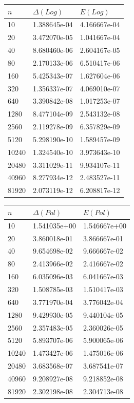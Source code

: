 \begin{figure}[H]
 \begin{subtable}[b]{0.5\textwidth}
  \centering\small
\begin{tabular}{lll}
\hline
$n$ & $\Delta(Log)$ & $E(Log)$\\
\hline
10 & 1.388645e-04 & 4.166667e-04\\
20 & 3.472070e-05 & 1.041667e-04\\
40 & 8.680460e-06 & 2.604167e-05\\
80 & 2.170133e-06 & 6.510417e-06\\
160 & 5.425343e-07 & 1.627604e-06\\
320 & 1.356337e-07 & 4.069010e-07\\
640 & 3.390842e-08 & 1.017253e-07\\
1280 & 8.477104e-09 & 2.543132e-08\\
2560 & 2.119278e-09 & 6.357829e-09\\
5120 & 5.298190e-10 & 1.589457e-09\\
10240 & 1.324540e-10 & 3.973643e-10\\
20480 & 3.311029e-11 & 9.934107e-11\\
40960 & 8.277934e-12 & 2.483527e-11\\
81920 & 2.073119e-12 & 6.208817e-12\\
\end{tabular}
 \end{subtable}
 \begin{subtable}[b]{0.5\textwidth}
  \centering\small
\begin{tabular}{lll}
\hline
$n$ & $\Delta(Pol)$ & $E(Pol)$\\
\hline
10 & 1.541035e+00 & 1.546667e+00\\
20 & 3.860018e-01 & 3.866667e-01\\
40 & 9.654698e-02 & 9.666667e-02\\
80 & 2.413966e-02 & 2.416667e-02\\
160 & 6.035096e-03 & 6.041667e-03\\
320 & 1.508785e-03 & 1.510417e-03\\
640 & 3.771970e-04 & 3.776042e-04\\
1280 & 9.429930e-05 & 9.440104e-05\\
2560 & 2.357483e-05 & 2.360026e-05\\
5120 & 5.893707e-06 & 5.900065e-06\\
10240 & 1.473427e-06 & 1.475016e-06\\
20480 & 3.683568e-07 & 3.687541e-07\\
40960 & 9.208927e-08 & 9.218852e-08\\
81920 & 2.302198e-08 & 2.304713e-08\\
\end{tabular}
 \end{subtable}
\end{figure}

